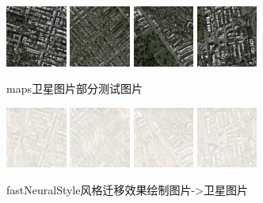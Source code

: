 \documentclass[conference]{IEEEtran}
\begin{document}
\begin{figure}[H]
	\centering
	\includegraphics[width=2cm]{PIC/maps/1033_A_real_A.png}
	\includegraphics[width=2cm]{PIC/maps/1037_A_real_A.png}
	\includegraphics[width=2cm]{PIC/maps/1039_A_real_A.png}
	\includegraphics[width=2cm]{PIC/maps/1041_A_real_A.png}
	\caption{maps卫星图片部分测试图片}
\end{figure}

\begin{figure}[H]
	\centering
	\includegraphics[width=2cm]{PIC/maps/pam1.jpg}
	\includegraphics[width=2cm]{PIC/maps/pam2.jpg}
	\includegraphics[width=2cm]{PIC/maps/pam3.jpg}
	\includegraphics[width=2cm]{PIC/maps/pam4.jpg}
	\caption{fastNeuralStyle风格迁移效果绘制图片->卫星图片}
\end{figure}
\end{document}
